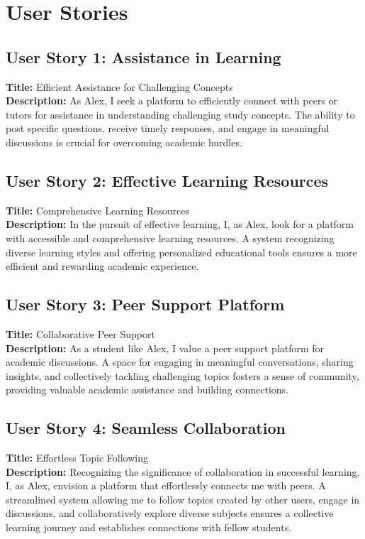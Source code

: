 \chapter{User Stories}\label{user_story_appendix}

\section{User Story 1: Assistance in Learning}
\textbf{Title:} Efficient Assistance for Challenging Concepts \\
\textbf{Description:} As Alex, I seek a platform to efficiently connect with peers or tutors for assistance in understanding challenging study concepts. The ability to post specific questions, receive timely responses, and engage in meaningful discussions is crucial for overcoming academic hurdles.

\section{User Story 2: Effective Learning Resources}
\textbf{Title:} Comprehensive Learning Resources \\
\textbf{Description:} In the pursuit of effective learning, I, as Alex, look for a platform with accessible and comprehensive learning resources. A system recognizing diverse learning styles and offering personalized educational tools ensures a more efficient and rewarding academic experience.

\section{User Story 3: Peer Support Platform}
\textbf{Title:} Collaborative Peer Support \\
\textbf{Description:} As a student like Alex, I value a peer support platform for academic discussions. A space for engaging in meaningful conversations, sharing insights, and collectively tackling challenging topics fosters a sense of community, providing valuable academic assistance and building connections.

\section{User Story 4: Seamless Collaboration}
\textbf{Title:} Effortless Topic Following \\
\textbf{Description:} Recognizing the significance of collaboration in successful learning, I, as Alex, envision a platform that effortlessly connects me with peers. A streamlined system allowing me to follow topics created by other users, engage in discussions, and collaboratively explore diverse subjects ensures a collective learning journey and establishes connections with fellow students.

